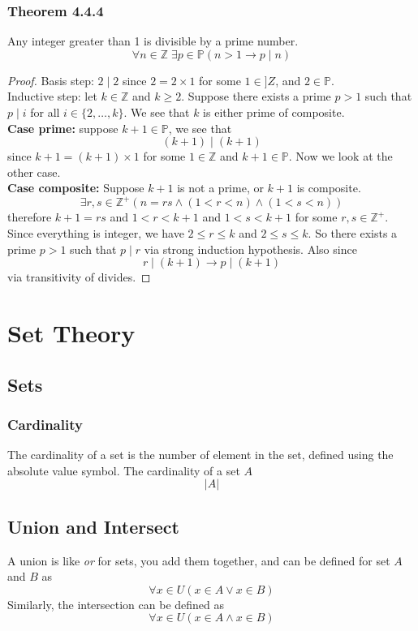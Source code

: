 \documentclass[12pt]{book}
\newcommand{\Z}{\mathbb{Z}}
\newcommand{\paren}[1]{\left( #1 \right)}
\newcommand{\abso}[1]{\left|#1 \right|}
\newcommand{\then}{\rightarrow}
\newcommand{\defcomp}{\exists r,s\in \Z^+ \paren{n=rs \wedge \paren{1<r<n} \wedge \paren{1<s<n}}}
\begin{document}
\subsubsection{Theorem 4.4.4}
Any integer greater than 1 is divisible by a prime number.
\[
\forall n \in \Z \; \exists p \in \mathbb{P} \paren{
n > 1 \then p \mid n
}
\]
\begin{proof}
    Basis step: $2 \mid 2$ since $2 = 2\times 1$ for some $1 \in ]Z$, and $2 \in \mathbb{P}$.\\

    Inductive step: let $k \in \Z$ and $k \geq 2$. Suppose there exists a prime $p > 1$ such that $p \mid i$ for all $i \in \{ 2,\ldots,k\}$. We see that $k$ is either prime of composite. \\
    \textbf{Case prime:} suppose $k+1 \in \mathbb{P}$, we see that
    \[
    (k+1) \mid (k+1)
    \]
    since $ k+1 = (k+1) \times 1$ for some $1 \in \Z$ and $k+1 \in \mathbb{P}$. Now we look at the other case.\\
    \textbf{Case composite:} Suppose $k+1$ is not a prime, or $k+1$ is composite.
    \[
    \defcomp
    \]
    therefore $k+1 = rs$ and $1<r<k+1$ and $1<s<k+1$ for some $r,s\in\Z^+$. Since everything is integer, we have $2 \leq r \leq k$ and $2 \leq s \leq k$. So there exists a prime $p>1$ such that $p \mid r$ via strong induction hypothesis. Also since
    \[
    r \mid (k+1) \then p \mid (k+1)
    \]
    via transitivity of divides.
    
    

    
\end{proof}


\section{Set Theory}
\subsection{Sets}
\subsubsection{Cardinality}
The cardinality of a set is the number of element in the set, defined using the absolute value symbol. The cardinality of a set $A$
\[
\abso{A}
\]

\subsection{Union and Intersect}
A union is like \textit{or} for sets, you add them together, and can be defined for set $A$ and $B$ as
\[
\forall x \in U \paren{x \in A \vee x \in B}
\]
Similarly, the intersection can be defined as
\[
\forall x \in U \paren{x \in A \wedge x \in B}
\]
\end{document}
